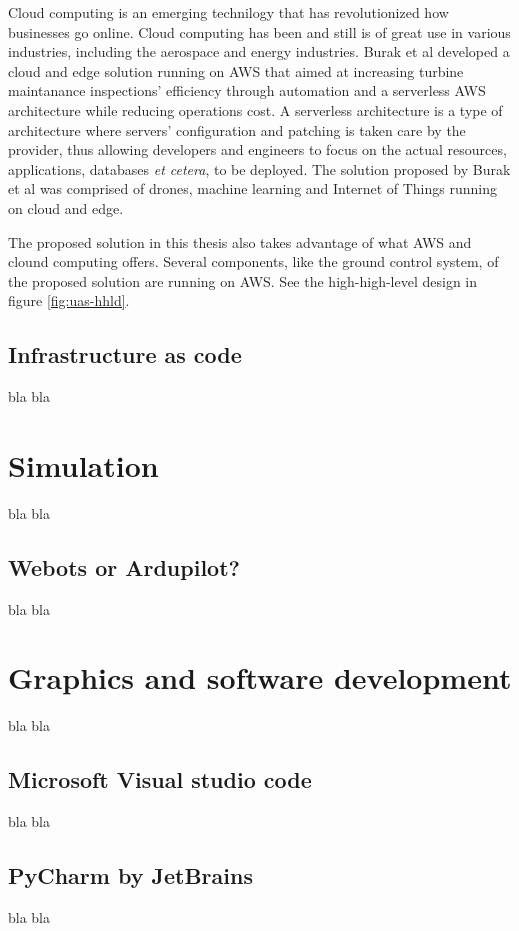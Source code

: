 Cloud computing is an emerging technilogy that has revolutionized how businesses go online. Cloud computing has been and still is of great use in various industries, including the aerospace and energy industries. Burak et al developed a cloud and edge solution running on AWS that aimed at increasing turbine maintanance inspections' efficiency through automation and a serverless AWS architecture while reducing operations cost\cite{burakawswindfarm2021}. A serverless architecture is a type of architecture where servers' configuration and patching is taken care by the provider, thus allowing developers and engineers to focus on the actual resources, applications, databases \textit{et cetera}, to be deployed. The solution proposed by Burak et al was comprised of drones, machine learning and Internet of Things running on cloud and edge.

The proposed solution in this thesis also takes advantage of what AWS and clound computing offers. Several components, like the ground control system, of the proposed solution are running on AWS. See the high-high-level design in figure \ref{fig:uas-hhld}.

\subsection{Infrastructure as code}
bla bla

\section{Simulation}
bla bla

\subsection{Webots or Ardupilot?}
bla bla

\section{Graphics and software development}
bla bla

\subsection{Microsoft Visual studio code}
\label{subsec:ms-visual-studio-code}
bla bla

\subsection{PyCharm by JetBrains}
\label{subsec:pycharm}
bla bla

